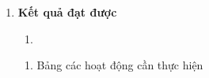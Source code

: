 \begin{enumerate}
\def\labelenumi{\arabic{enumi}.}
\setcounter{enumi}{3}
\item
  \textbf{Kết quả đạt được}

  \begin{enumerate}
  \def\labelenumii{\arabic{enumii}.}
  \tightlist
  \item
  \end{enumerate}

  \begin{enumerate}
  \def\labelenumii{\arabic{enumii}.}
  \item
    \protect{}\label{Cuxe1c_houx1ea1t_ux111ux1ed9ng_manual}{}Bảng các hoạt động cần thực hiện
  \end{enumerate}
\end{enumerate}
